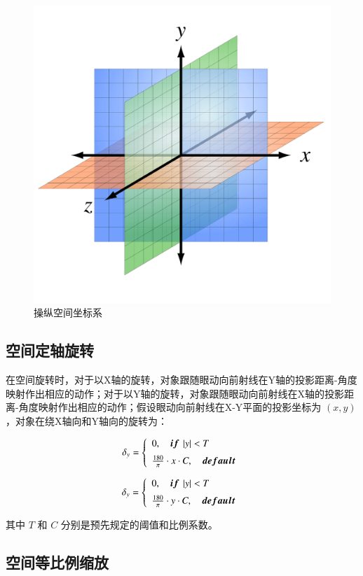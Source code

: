 \begin{figure}[b!]
    \centering
    \includegraphics[width=.4\textwidth]{figure/coordinate.png}
    \caption{操纵空间坐标系}
    \label{fig-3-3}
\end{figure}

\subsection{空间定轴旋转}

在空间旋转时，对于以X轴的旋转，对象跟随眼动向前射线在Y轴的投影距离-角度映射作出相应的动作；对于以Y轴的旋转，对象跟随眼动向前射线在X轴的投影距离-角度映射作出相应的动作；假设眼动向前射线在X-Y平面的投影坐标为 $(x, y)$ ，对象在绕X轴向和Y轴向的旋转为：

\begin{equation}
	\label{formula-3-5}
	\delta_y = 
    \left\{
    \begin{array}{l}
        0, \quad {\mbox{\boldmath $if$}}\ \left|y\right| < T \\ [0.2cm]
        \frac{180}{\pi} \cdot x \cdot C,\quad {\mbox{\boldmath $default$}}
    \end{array}
    \right.
\end{equation}
 
\begin{equation}
	\label{formula-3-6}
	\delta_y = 
    \left\{
    \begin{array}{l}
        0, \quad {\mbox{\boldmath $if$}}\ \left|y\right| < T \\ [0.2cm]
        \frac{180}{\pi} \cdot y \cdot C,\quad {\mbox{\boldmath $default$}}
    \end{array}
    \right.
\end{equation}

其中 $T$ 和 $C$ 分别是预先规定的阈值和比例系数。

\subsection{空间等比例缩放}

